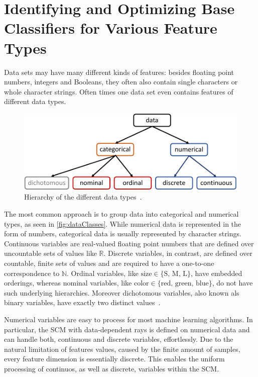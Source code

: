 \chapter{Identifying and Optimizing Base Classifiers for Various Feature Types}\label{ch:varFeat}

Data sets may have many different kinds of features: besides floating point numbers, integers and Booleans,
they often also contain single characters or whole character strings.
Often times one data set even contains features of different data types.

\begin{figure}[ht]
    \centering
    \includegraphics[width=\columnwidth]{figures/data_classes.pdf}
    \caption{Hierarchy of the different data types~\citep{brownlee,dahouda}.}\label{fig:dataClasses}
\end{figure}

The most common approach is to group data into categorical and numerical types, as seen in \autoref{fig:dataClasses}.
While numerical data is represented in the form of numbers, categorical data is usually represented by character strings.
Continuous variables are real-valued floating point numbers that are defined over uncountable sets of values like \(\mathbb{R}\).
Discrete variables, in contrast, are defined over countable, finite sets of values and are required to have a one-to-one correspondence to \(\mathbb{N}\).
Ordinal variables, like \(\text{size} \in \{\text{S, M, L}\}\), have embedded orderings,
whereas nominal variables, like \(\text{color} \in \{\text{red, green, blue}\}\), do not have such underlying hierarchies.
Moreover dichotomous variables, also known als binary variables, have exactly two distinct values~\citep{brownlee, dahouda}.

Numerical variables are easy to process for most machine learning algorithms.
In particular, the SCM with data-dependent rays is defined on numerical data and can handle both, continuous and discrete variables, effortlessly.
Due to the natural limitation of features values, caused by the finite amount of samples, every feature dimension is essentially discrete.
This enables the uniform processing of continuos, as well as discrete, variables within the SCM.\

